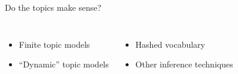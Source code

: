 \documentclass[compress]{beamer}
\begin{document}
\begin{frame}{Do the topics make sense?}

\begin{columns}
\begin{itemize}
  \item Finite topic models
  \item ``Dynamic'' topic models
\end{itemize}

\begin{itemize}
  \item Hashed vocabulary
  \item Other inference techniques
\end{itemize}
\end{columns}


\end{frame}
\end{document}
